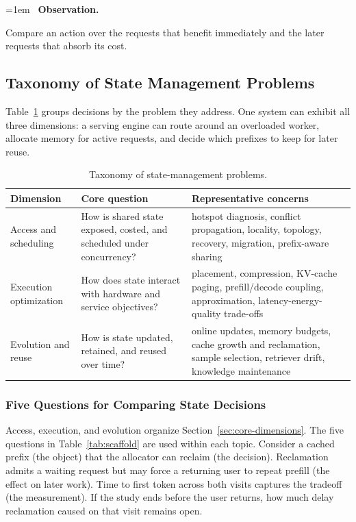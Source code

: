 \documentclass[manuscript]{acmart}
\newenvironment{keybox}{%
  \par\smallskip\noindent
  \begin{lrbox}{\keyboxcontent}
  \begin{minipage}{\dimexpr\linewidth-2\fboxsep-2\fboxrule-1.5pt\relax}
  \raggedright
  \emergencystretch=1em
  {\color{keyborder}\faLightbulbO}\ \textbf{\textcolor{keyborder}{Observation.}}\space
}{%
  \end{minipage}
  \end{lrbox}
  \fcolorbox{keyborder}{keybg}{\usebox{\keyboxcontent}}%
  \par\smallskip
}
\begin{document}
\begin{keybox}
Compare an action over the requests that benefit immediately and the later requests that absorb its cost.
\end{keybox}

\subsection{Taxonomy of State Management Problems}

Table~\ref{tab:taxonomy} groups decisions by the problem they address. One system can exhibit all three dimensions: a serving engine can route around an overloaded worker, allocate memory for active requests, and decide which prefixes to keep for later reuse.

\begin{table}[t]
\small
\caption{Taxonomy of state-management problems.}
\label{tab:taxonomy}
\begin{tabular}{@{}p{}p{}p{}@{}}
\toprule
Dimension & Core question & Representative concerns \\
\midrule
Access and scheduling & How is shared state exposed, costed, and scheduled under concurrency? & hotspot diagnosis, conflict propagation, locality, topology, recovery, migration, prefix-aware sharing \\

Execution optimization & How does state interact with hardware and service objectives? & placement, compression, KV-cache paging, prefill/decode coupling, approximation, latency-energy-quality trade-offs \\

Evolution and reuse & How is state updated, retained, and reused over time? & online updates, memory budgets, cache growth and reclamation, sample selection, retriever drift, knowledge maintenance \\
\bottomrule
\end{tabular}
\end{table}

\subsubsection{Five Questions for Comparing State Decisions}

Access, execution, and evolution organize Section~\ref{sec:core-dimensions}. The five questions in Table~\ref{tab:scaffold} are used within each topic. Consider a cached prefix (the object) that the allocator can reclaim (the decision). Reclamation admits a waiting request but may force a returning user to repeat prefill (the effect on later work). Time to first token across both visits captures the tradeoff (the measurement). If the study ends before the user returns, how much delay reclamation caused on that visit remains open.
\end{document}

